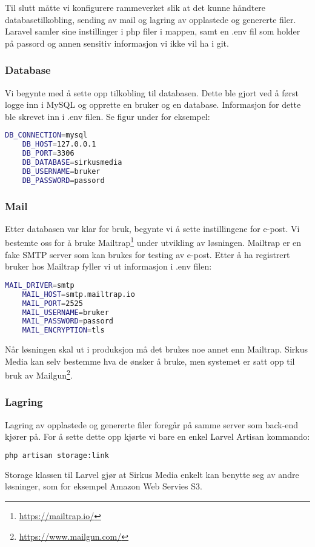Til slutt måtte vi konfigurere rammeverket slik at det kunne håndtere databasetilkobling, sending av mail og lagring av opplastede og genererte filer.
Laravel samler sine instillinger i php filer i  mappen, samt en .env fil som holder på passord og annen sensitiv informasjon vi ikke vil ha i git.

\subsubsection{Database}
Vi begynte med å sette opp tilkobling til databasen. Dette ble gjort ved å først logge inn i MySQL og opprette en bruker og en database. Informasjon for dette ble skrevet inn i .env filen. Se figur under for eksempel:
\begin{lstlisting}[caption={Laravel .env database secrets},language=bash]
    DB_CONNECTION=mysql
    DB_HOST=127.0.0.1
    DB_PORT=3306
    DB_DATABASE=sirkusmedia
    DB_USERNAME=bruker
    DB_PASSWORD=passord
\end{lstlisting}

\subsubsection{Mail}
Etter databasen var klar for bruk, begynte vi å sette instillingene for e-post.
Vi bestemte oss for å bruke Mailtrap\footnote{\url{https://mailtrap.io/}} under utvikling av løsningen. Mailtrap\cite{mailtrap2019setfsad} er en fake SMTP server som kan brukes for testing av e-post.
Etter å ha registrert bruker hos Mailtrap fyller vi ut informasjon i .env filen:
\begin{lstlisting}[caption={Laravel .env mail secrets}, language=bash]
    MAIL_DRIVER=smtp
    MAIL_HOST=smtp.mailtrap.io
    MAIL_PORT=2525
    MAIL_USERNAME=bruker
    MAIL_PASSWORD=passord
    MAIL_ENCRYPTION=tls
\end{lstlisting}

Når løsningen skal ut i produksjon må det brukes noe annet enn Mailtrap. Sirkus Media kan selv bestemme hva de ønsker å bruke, men systemet er satt opp til bruk av Mailgun\footnote{\url{https://www.mailgun.com/}}.

\subsubsection{Lagring}
Lagring av opplastede og genererte filer foregår på samme server som back-end kjører på.
For å sette dette opp kjørte vi bare en enkel Larvel Artisan kommando:
\begin{lstlisting}[caption={Laravel Artisan kommando for å sette opp lagring av filer}, language=bash]
    php artisan storage:link
\end{lstlisting}
Storage klassen til Larvel gjør at Sirkus Media enkelt kan benytte seg av andre løsninger, som for eksempel Amazon Web Servies S3.

